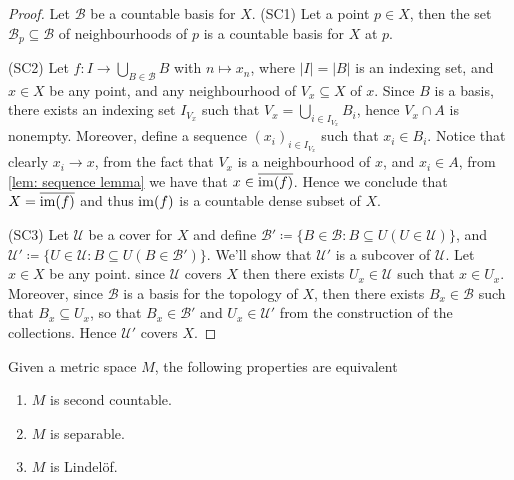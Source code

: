 \begin{proof}
Let \(\mathcal B\) be a countable basis for \(X\).
(SC1) Let a point \(p \in X\), then the set \(\mathcal B_p \subseteq \mathcal
B\) of neighbourhoods of \(p\) is a countable basis for \(X\) at \(p\).

(SC2) Let \(f: I \to \bigcup_{B \in \mathcal B} B\) with \(n \mapsto x_n\),
where \(|I| = |B|\) is an indexing set, and \(x \in X\) be any point, and any
neighbourhood of \(V_x \subseteq X\) of \(x\). Since \(B\) is a basis, there
exists an indexing set \(I_{V_x}\) such that \(V_x = \bigcup_{i \in  I_{V_x}}
B_i\), hence \(V_x \cap A\) is nonempty. Moreover, define a sequence
\((x_i)_{i \in I_{V_x}}\) such that \(x_i \in B_i\). Notice that clearly \(x_i
\to x\), from the fact that \(V_x\) is a neighbourhood of \(x\), and \(x_i \in
A\), from \cref{lem: sequence lemma} we have that \(x \in \overline{\operatorname{im}(f)}\).
Hence we conclude that \(X = \overline{\operatorname{im}(f)}\) and thus \(\operatorname{im}(f)\) is a
countable dense subset of \(X\).

(SC3) Let \(\mathcal U\) be a cover for \(X\) and define \(\mathcal B' \coloneq
\{B \in \mathcal B \colon B \subseteq U (U \in \mathcal U)\}\), and \(\mathcal
U' \coloneq \{U \in \mathcal U \colon B \subseteq U (B \in \mathcal
B')\}\). We'll show that \(\mathcal U'\) is a subcover of \(\mathcal U\). Let
\(x \in X\) be any point.  since \(\mathcal U\) covers \(X\) then there exists
\(U_x \in \mathcal U\) such that \(x \in U_x\). Moreover, since \(\mathcal B\)
is a basis for the topology of \(X\), then there exists \(B_x \in \mathcal B\)
such that \(B_x \subseteq U_x\), so that \(B_x \in \mathcal B'\) and \(U_x \in
\mathcal U'\) from the construction of the collections. Hence \(\mathcal U'\)
covers \(X\).
\end{proof}

\begin{proposition}\label{prop: metric space properties}
Given a metric space \(M\), the following properties are equivalent
\begin{enumerate}[(MS1)]
\item \(M\) is second countable.
\item \(M\) is separable.
\item \(M\) is Lindelöf.
\end{enumerate}
\end{proposition}

